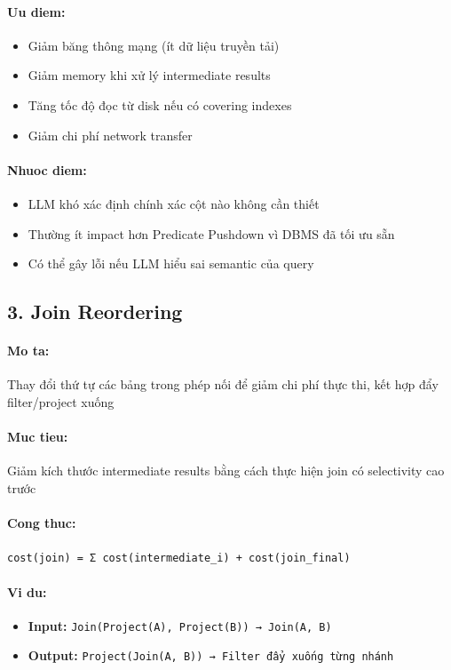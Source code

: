 \paragraph{Uu diem:}
\begin{itemize}
\item Giảm băng thông mạng (ít dữ liệu truyền tải)
\item Giảm memory khi xử lý intermediate results
\item Tăng tốc độ đọc từ disk nếu có covering indexes
\item Giảm chi phí network transfer
\end{itemize}
\paragraph{Nhuoc diem:}
\begin{itemize}
\item LLM khó xác định chính xác cột nào không cần thiết
\item Thường ít impact hơn Predicate Pushdown vì DBMS đã tối ưu sẵn
\item Có thể gây lỗi nếu LLM hiểu sai semantic của query
\end{itemize}
\newpage

\subsection*{\bfseries 3. Join Reordering}
\paragraph{Mo ta:} Thay đổi thứ tự các bảng trong phép nối để giảm chi phí thực thi, kết hợp đẩy filter/project xuống
\paragraph{Muc tieu:} Giảm kích thước intermediate results bằng cách thực hiện join có selectivity cao trước
\paragraph{Cong thuc:} \texttt{cost(join) = Σ cost(intermediate_i) + cost(join_final)}
\paragraph{Vi du:}
\begin{itemize}
\item \textbf{Input:} \texttt{Join(Project(A), Project(B)) → Join(A, B)}
\item \textbf{Output:} \texttt{Project(Join(A, B)) → Filter đẩy xuống từng nhánh}
\end{itemize}
